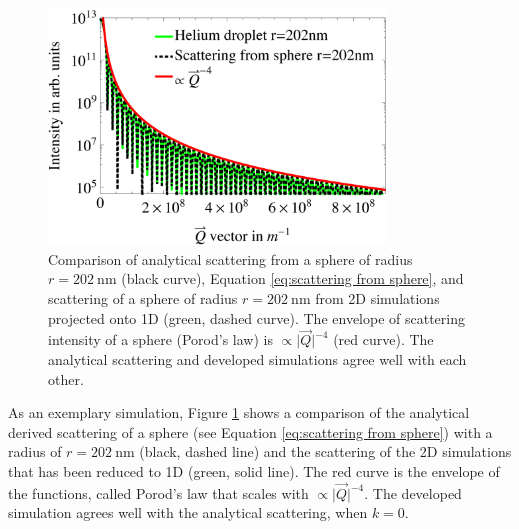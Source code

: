 \begin{figure}
	\centering
		\includegraphics[width=0.80\textwidth]{images/cluster-sphere-intact.png}
	\caption[Comparison of analytical derived scattering and numerical simulations.]{Comparison of analytical scattering from a sphere of radius $r=\SI{202}{\nano\meter}$ (black curve), Equation \eqref{eq:scattering from sphere}, and scattering of a sphere of radius $r=\SI{202}{\nano\meter}$ from 2D simulations projected onto 1D (green, dashed curve). The envelope of scattering intensity of a sphere (Porod's law) is $\propto \lvert \vec{Q}\rvert^{-4}$ (red curve). The analytical scattering and developed simulations agree well with each other.}
	\label{fig:cluster-sphere-intact-2D}
\end{figure}
As an exemplary simulation, Figure \ref{fig:cluster-sphere-intact-2D} shows a comparison of the analytical derived scattering of a sphere (see Equation \eqref{eq:scattering from sphere}) with a radius of $r=\SI{202}{\nano\meter}$ (black, dashed line) and the scattering of the 2D simulations that has been reduced to 1D (green, solid line). The red curve is the envelope of the functions, called Porod's law that scales with $\propto \lvert \vec{Q}\rvert^{-4}$. The developed simulation agrees well with the analytical scattering, when $k=0$.
%
%
%
